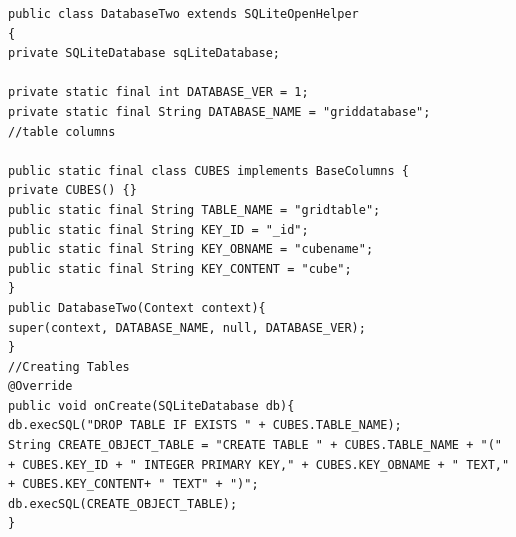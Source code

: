 \documentclass[fontsize=11pt, %
paper=a4, %
twoside, %
captions=tableheading,
index=totoc,
hyperref]{labbook}
\begin{document}
\begin{verbatim}
public class DatabaseTwo extends SQLiteOpenHelper
{
private SQLiteDatabase sqLiteDatabase;

private static final int DATABASE_VER = 1;
private static final String DATABASE_NAME = "griddatabase";
//table columns

public static final class CUBES implements BaseColumns {
private CUBES() {}
public static final String TABLE_NAME = "gridtable";
public static final String KEY_ID = "_id";
public static final String KEY_OBNAME = "cubename";
public static final String KEY_CONTENT = "cube";
}
public DatabaseTwo(Context context){
super(context, DATABASE_NAME, null, DATABASE_VER);
}
//Creating Tables
@Override
public void onCreate(SQLiteDatabase db){
db.execSQL("DROP TABLE IF EXISTS " + CUBES.TABLE_NAME);
String CREATE_OBJECT_TABLE = "CREATE TABLE " + CUBES.TABLE_NAME + "("
+ CUBES.KEY_ID + " INTEGER PRIMARY KEY," + CUBES.KEY_OBNAME + " TEXT,"
+ CUBES.KEY_CONTENT+ " TEXT" + ")";
db.execSQL(CREATE_OBJECT_TABLE);
}
\end{verbatim}
\end{document}
